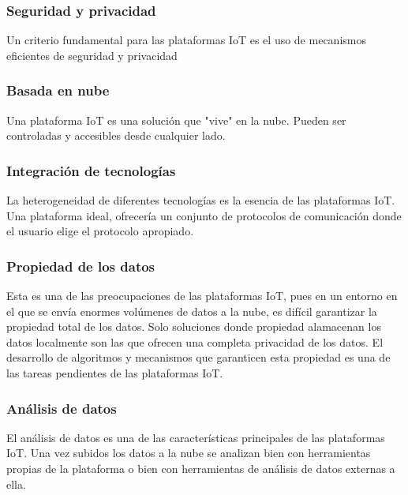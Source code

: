 \documentclass[12pt, twoside]{book}
\begin{document}
\subsubsection*{Seguridad y privacidad}
Un criterio fundamental para las plataformas IoT es el uso de mecanismos eficientes de seguridad y privacidad
\subsubsection*{Basada en nube}
Una plataforma IoT es una solución que "vive" en la nube. Pueden ser controladas y accesibles desde cualquier lado.
\subsubsection*{Integración de tecnologías}
La heterogeneidad de diferentes tecnologías es la esencia de las plataformas IoT. Una plataforma ideal, ofrecería un conjunto de protocolos de comunicación donde el usuario elige el protocolo apropiado.
\subsubsection*{Propiedad de los datos}
Esta es una de las preocupaciones de las plataformas IoT, pues en un entorno en el que se envía enormes volúmenes de datos a la nube, es difícil garantizar la propiedad total de los datos. Solo soluciones donde propiedad alamacenan los datos localmente son las que ofrecen una completa privacidad de los datos. El desarrollo de algoritmos y mecanismos que garanticen esta propiedad es una de las tareas pendientes de las plataformas IoT.
\subsubsection*{Análisis de datos}
El análisis de datos es una de las características principales de las plataformas IoT. Una vez subidos los datos a la nube se analizan bien con herramientas propias de la plataforma o bien con herramientas de análisis de datos externas a ella.
\end{document}
